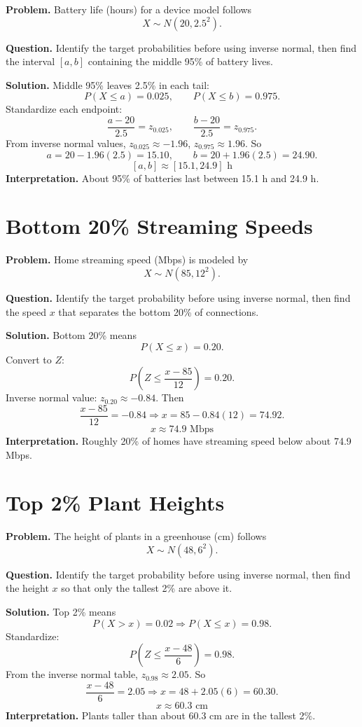\textbf{Problem.}
Battery life (hours) for a device model follows
\[
X \sim N(20, 2.5^2).
\]

\textbf{Question.} Identify the target probabilities before using inverse normal, then find the interval \([a,b]\) containing the middle 95\% of battery lives.

\textbf{Solution.}
Middle 95\% leaves 2.5\% in each tail:
\[
P(X\le a)=0.025,\qquad P(X\le b)=0.975.
\]
Standardize each endpoint:
\[
\frac{a-20}{2.5}=z_{0.025},\qquad \frac{b-20}{2.5}=z_{0.975}.
\]
From inverse normal values, \(z_{0.025}\approx -1.96\), \(z_{0.975}\approx 1.96\).
So
\[
a=20-1.96(2.5)=15.10,\qquad b=20+1.96(2.5)=24.90.
\]
\[
\boxed{[a,b]\approx[15.1,24.9]\text{ h}}
\]
\textbf{Interpretation.} About 95\% of batteries last between 15.1 h and 24.9 h.

\section{Bottom 20\% Streaming Speeds}

\textbf{Problem.}
Home streaming speed (Mbps) is modeled by
\[
X \sim N(85, 12^2).
\]

\textbf{Question.} Identify the target probability before using inverse normal, then find the speed \(x\) that separates the bottom 20\% of connections.

\textbf{Solution.}
Bottom 20\% means
\[
P(X\le x)=0.20.
\]
Convert to \(Z\):
\[
P\!\left(Z\le \frac{x-85}{12}\right)=0.20.
\]
Inverse normal value: \(z_{0.20}\approx -0.84\).
Then
\[
\frac{x-85}{12}=-0.84 \Rightarrow x=85-0.84(12)=74.92.
\]
\[
\boxed{x\approx 74.9\text{ Mbps}}
\]
\textbf{Interpretation.} Roughly 20\% of homes have streaming speed below about 74.9 Mbps.

\section{Top 2\% Plant Heights}

\textbf{Problem.}
The height of plants in a greenhouse (cm) follows
\[
X \sim N(48, 6^2).
\]

\textbf{Question.} Identify the target probability before using inverse normal, then find the height \(x\) so that only the tallest 2\% are above it.

\textbf{Solution.}
Top 2\% means
\[
P(X>x)=0.02 \Rightarrow P(X\le x)=0.98.
\]
Standardize:
\[
P\!\left(Z\le \frac{x-48}{6}\right)=0.98.
\]
From the inverse normal table, \(z_{0.98}\approx 2.05\).
So
\[
\frac{x-48}{6}=2.05 \Rightarrow x=48+2.05(6)=60.30.
\]
\[
\boxed{x\approx 60.3\text{ cm}}
\]
\textbf{Interpretation.} Plants taller than about 60.3 cm are in the tallest 2\%.

